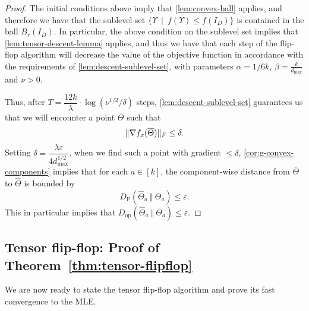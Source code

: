 \documentclass[aos]{imsart}
\theoremstyle{definition}
\numberwithin{equation}{section}
\DeclarePairedDelimiter{\norm}{\lVert}{\rVert}
\newcommand{\otheta}{\overline{\Theta}}
\newcommand{\htheta}{\widehat{\Theta}}
\newcommand{\eps}{\varepsilon}
\newcommand{\DF}{D_{\operatorname{F}}}
\newcommand{\Dop}{D_{\operatorname{op}}}
\def\dmax{d_{\max}}
\begin{document}
\begin{proof}
	The initial conditions above imply that \cref{lem:convex-ball} applies, and therefore we have that the sublevel set $\{ \Upsilon \ \mid \ f(\Upsilon) \leq f(I_D)  \}$ is contained in the ball $B_r(I_D)$. In particular, the above condition on the sublevel set implies that \cref{lem:tensor-descent-lemma} applies, and thus we have that each step of the flip-flop algorithm will decrease the value of the objective function in accordance with the requirements of \cref{lem:descent-sublevel-set}, with parameters $\alpha = 1/6k$, $\beta = \frac{k}{\dmax}$ and $\nu > 0$.

	Thus, after $T = \dfrac{12k}{\lambda} \cdot \log(\nu^{1/2}/\delta)$ steps, \cref{lem:descent-sublevel-set} guarantees us that we will encounter a point $\otheta$ such that
	$$ \norm{\nabla f_x(\otheta)}_F \leq \delta.$$
	Setting $\delta = \dfrac{\lambda \eps}{4 \dmax^{1/2}}$, when we find such a point with gradient $\leq \delta$, \cref{cor:g-convex-components} implies that for each $a \in [k]$, the component-wise distance from $\otheta$ to $\htheta$ is bounded by
	$$ \DF(\htheta_a \ \Vert  \ \otheta_a) \leq \eps. $$
	This in particular implies that $\Dop(\htheta_a \ \Vert  \ \otheta_a) \leq \eps.$
\end{proof}

\subsection{Tensor flip-flop: Proof of Theorem~\ref{thm:tensor-flipflop}}

We are now ready to state the tensor flip-flop algorithm and prove its fast convergence to the MLE.
\end{document}
